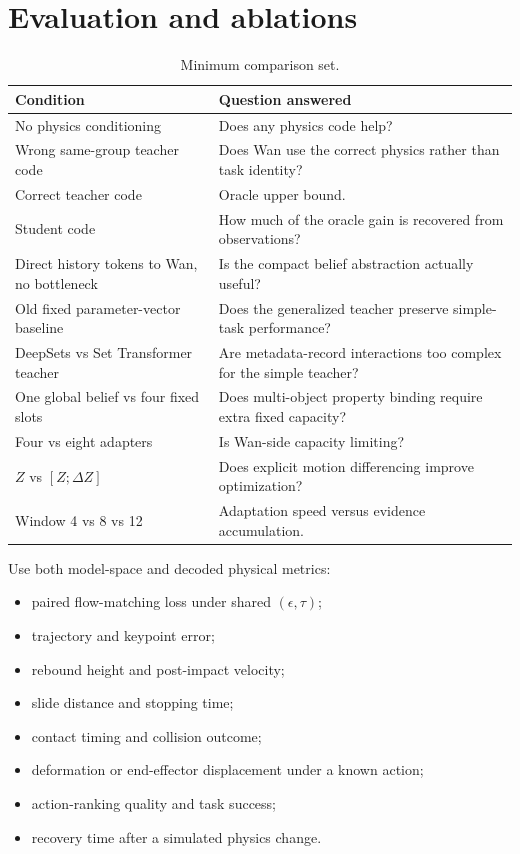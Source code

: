 \documentclass[11pt]{article}
\begin{document}
\section{Evaluation and ablations}

\begin{table}[H]
\centering
\small
\caption{Minimum comparison set.}
\begin{tabularx}{\textwidth}{L{0.27\textwidth} Y}
\toprule
Condition & Question answered \\
\midrule
No physics conditioning & Does any physics code help? \\
Wrong same-group teacher code & Does Wan use the correct physics rather than task identity? \\
Correct teacher code & Oracle upper bound. \\
Student code & How much of the oracle gain is recovered from observations? \\
Direct history tokens to Wan, no bottleneck & Is the compact belief abstraction actually useful? \\
Old fixed parameter-vector baseline & Does the generalized teacher preserve simple-task performance? \\
DeepSets vs Set Transformer teacher & Are metadata-record interactions too complex for the simple teacher? \\
One global belief vs four fixed slots & Does multi-object property binding require extra fixed capacity? \\
Four vs eight adapters & Is Wan-side capacity limiting? \\
$Z$ vs $[Z;\Delta Z]$ & Does explicit motion differencing improve optimization? \\
Window 4 vs 8 vs 12 & Adaptation speed versus evidence accumulation. \\
\bottomrule
\end{tabularx}
\end{table}

Use both model-space and decoded physical metrics:
\begin{itemize}
  \item paired flow-matching loss under shared $(\epsilon,\tau)$;
  \item trajectory and keypoint error;
  \item rebound height and post-impact velocity;
  \item slide distance and stopping time;
  \item contact timing and collision outcome;
  \item deformation or end-effector displacement under a known action;
  \item action-ranking quality and task success;
  \item recovery time after a simulated physics change.
\end{itemize}
\end{document}
